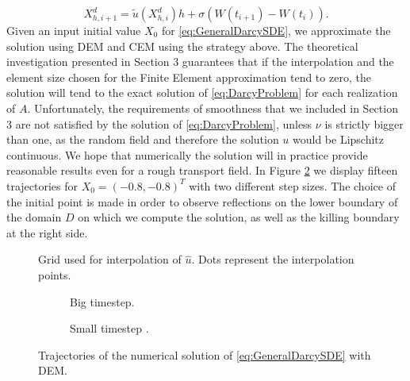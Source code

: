 \begin{equation}\label{eq:DEMDarcy}
	X^d_{h,i+1} = \tilde{u}(X^d_{h,i}) h + \sigma (W(t_{i+1}) - W(t_i)).
\end{equation}
Given an input initial value $X_0$ for \eqref{eq:GeneralDarcySDE}, we approximate the solution using DEM and CEM using the strategy above. The theoretical investigation presented in Section 3 guarantees that if the interpolation and the element size chosen for the Finite Element approximation tend to zero, the solution will tend to the exact solution of \eqref{eq:DarcyProblem} for each realization of $A$. Unfortunately, the requirements of smoothness that we included in Section 3 are not satisfied by the solution of \eqref{eq:DarcyProblem}, unless $\nu$ is strictly bigger than one, as the random field and therefore the solution $u$ would be Lipschitz continuous. We hope that numerically the solution will in practice provide reasonable results even for a rough transport field. In Figure \ref{fig:TrajSDEDarcy} we display fifteen trajectories for $X_0 = (-0.8,-0.8)^T$ with two different step sizes. The choice of the initial point is made in order to observe reflections on the lower boundary of the domain $D$ on which we compute the solution, as well as the killing boundary at the right side. 

\begin{figure}[t]
    \centering
    \resizebox{0.6\linewidth}{!}{ }  
    \caption{Grid used for interpolation of $\hat{u}$. Dots represent the interpolation points.}
    \label{fig:GridVelocity}
\end{figure}

\begin{figure}[t]
    \centering
    \begin{subfigure}{0.49\linewidth}
        \centering
        \resizebox{1\linewidth}{!}{ }  
        \caption{Big timestep.}
    \end{subfigure}
    \begin{subfigure}{0.49\linewidth}
        \centering
        \resizebox{1\linewidth}{!}{ }  
        \caption{Small timestep .}
    \end{subfigure}    
    \caption{Trajectories of the numerical solution of \eqref{eq:GeneralDarcySDE} with DEM.}
    \label{fig:TrajSDEDarcy}
\end{figure}

